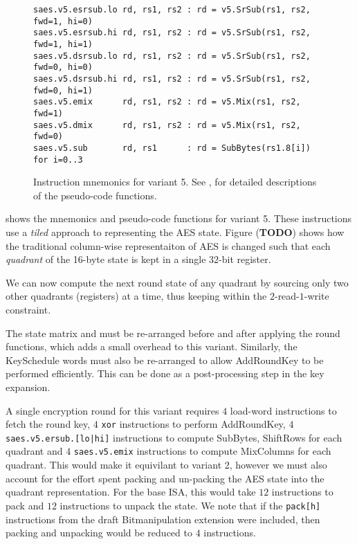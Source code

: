 
\begin{figure}
\begin{lstlisting}[language=pseudo,style=block]
saes.v5.esrsub.lo rd, rs1, rs2 : rd = v5.SrSub(rs1, rs2, fwd=1, hi=0)
saes.v5.esrsub.hi rd, rs1, rs2 : rd = v5.SrSub(rs1, rs2, fwd=1, hi=1)
saes.v5.dsrsub.lo rd, rs1, rs2 : rd = v5.SrSub(rs1, rs2, fwd=0, hi=0)
saes.v5.dsrsub.hi rd, rs1, rs2 : rd = v5.SrSub(rs1, rs2, fwd=0, hi=1)
saes.v5.emix      rd, rs1, rs2 : rd = v5.Mix(rs1, rs2, fwd=1)
saes.v5.dmix      rd, rs1, rs2 : rd = v5.Mix(rs1, rs2, fwd=0)
saes.v5.sub       rd, rs1      : rd = SubBytes(rs1.8[i])         for i=0..3
\end{lstlisting}
\caption{
    Instruction mnemonics for variant 5.
    See ,  for detailed
    descriptions of the pseudo-code functions.
}
\label{fig:mnemonics:v5}
\end{figure}

 shows the mnemonics and pseudo-code functions
for variant 5.
These instructions use a {\em tiled} approach to representing the
AES state.
Figure ({\bf TODO}) shows how the traditional column-wise representaiton
of AES is changed such that each {\em quadrant} of the 16-byte state
is kept in a single $32$-bit register.

We can now compute the next round state of any quadrant by sourcing
only two other quadrants (registers) at a time, thus keeping within
the $2$-read-$1$-write constraint.

The state matrix and must be re-arranged before and after applying
the round functions, which adds a small overhead to this variant.
Similarly, the KeySchedule words must also be re-arranged to allow
AddRoundKey to be performed efficiently.
This can be done as a post-processing step in the key expansion.

A single encryption round for this variant requires
$4$ load-word instructions to fetch the round key,
$4$ {\tt xor} instructions to perform AddRoundKey,
$4$ {\tt saes.v5.ersub.[lo|hi]} instructions to compute
    SubBytes, ShiftRows for each quadrant
and
$4$ {\tt saes.v5.emix} instructions to compute MixColumns for each
quadrant.
This would make it equivilant to variant 2, however we must also
account for the effort spent packing and un-packing the AES
state into the quadrant representation.
For the base ISA, this would take $12$ instructions to pack and
$12$ instructions to unpack the state.
We note that if the {\tt pack[h]} instructions from the draft
Bitmanipulation extension were included, then packing and unpacking
would be reduced to $4$ instructions.


